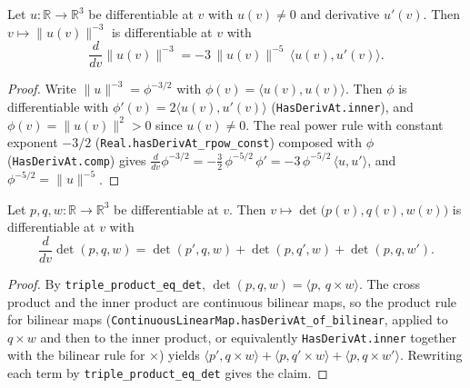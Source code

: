 \begin{lemma}
    \label{lem:recip-norm-cube-deriv}
    \leanok
    Let $u:\mathbb{R}\to\mathbb{R}^3$ be differentiable at $v$ with $u(v)\neq0$ and
    derivative $u'(v)$. Then $v\mapsto\lVert u(v)\rVert^{-3}$ is differentiable at
    $v$ with
    \[
        \frac{d}{dv}\lVert u(v)\rVert^{-3}
          = -3\,\lVert u(v)\rVert^{-5}\,\langle u(v),u'(v)\rangle .
    \]
\end{lemma}
\begin{proof}
    Write $\lVert u\rVert^{-3}=\phi^{-3/2}$ with $\phi(v)=\langle u(v),u(v)\rangle$.
    Then $\phi$ is differentiable with $\phi'(v)=2\langle u(v),u'(v)\rangle$
    (\texttt{HasDerivAt.inner}), and $\phi(v)=\lVert u(v)\rVert^2>0$ since
    $u(v)\neq0$. The real power rule with constant exponent $-3/2$
    (\texttt{Real.hasDerivAt\_rpow\_const}) composed with $\phi$
    (\texttt{HasDerivAt.comp}) gives
    $\frac{d}{dv}\phi^{-3/2}=-\tfrac32\,\phi^{-5/2}\,\phi'
       =-3\,\phi^{-5/2}\,\langle u,u'\rangle$, and $\phi^{-5/2}=\lVert u\rVert^{-5}$.
\end{proof}

\begin{lemma}
    \label{lem:triple-product-deriv}
    Let $p,q,w:\mathbb{R}\to\mathbb{R}^3$ be differentiable at $v$. Then
    $v\mapsto\det\bigl(p(v),q(v),w(v)\bigr)$ is differentiable at $v$ with
    \[
        \frac{d}{dv}\det(p,q,w)=\det(p',q,w)+\det(p,q',w)+\det(p,q,w').
    \]
\end{lemma}
\begin{proof}
    By \texttt{triple\_product\_eq\_det}, $\det(p,q,w)=\langle p,\,q\times w\rangle$.
    The cross product and the inner product are continuous bilinear maps, so the
    product rule for bilinear maps
    (\texttt{ContinuousLinearMap.hasDerivAt\_of\_bilinear}, applied to $q\times w$
    and then to the inner product, or equivalently \texttt{HasDerivAt.inner}
    together with the bilinear rule for $\times$) yields
    $\langle p',q\times w\rangle+\langle p,q'\times w\rangle+\langle p,q\times w'\rangle$.
    Rewriting each term by \texttt{triple\_product\_eq\_det} gives the claim.
\end{proof}

